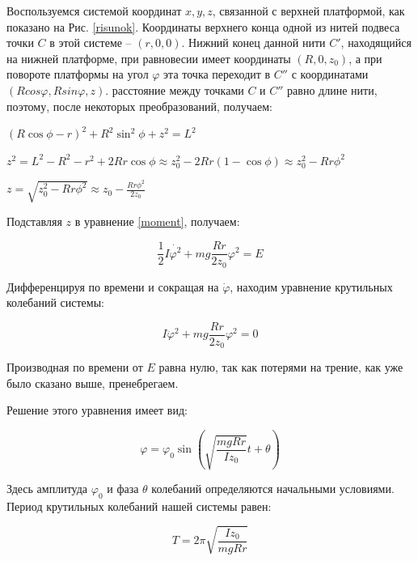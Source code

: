 \documentclass[a4, 12pt]{article}
\begin{document}
	Воспользуемся системой координат $x, y, z$, связанной с верхней платформой, как показано на Рис. \ref{risunok}. Координаты верхнего конца одной из нитей подвеса точки $C$ в этой системе -- $(r, 0, 0)$. Нижний конец данной нити $C'$, находящийся на нижней платформе, при равновесии имеет координаты $(R, 0, z_0)$, а при повороте платформы на угол $\varphi$ эта точка переходит в $C''$ с координатами $(Rcos\varphi, Rsin\varphi, z)$. расстояние между точками $C$ и $C''$ равно длине нити, поэтому, после некоторых преобразований, получаем:

	\begin{center}
	\begin{spacing}{1.6}
		$ (R\cos\phi - r)^2 + R^2\sin^2\phi + z^2 = L^2 $

		$ z^2 = L^2 - R^2 - r^2 + 2Rr\cos\phi \approx z^2_{0} - 2Rr(1 - \cos\phi) \approx z^2_{0} - Rr\phi^2 $

		$ z = \sqrt{z^2_{0} - Rr\phi^2} \approx z_{0} - \frac{Rr\phi^2}{2z_{0}} $
	\end{spacing}
	\end{center}

	Подставляя $z$ в уравнение \eqref{moment}, получаем:

	\begin{equation}
		\frac{1}{2}I\dot{\varphi^2} + mg \frac{Rr}{2z_0}\varphi^2 = E
	\end{equation}

	Дифференцируя по времени и сокращая на $\dot\varphi$, находим уравнение крутильных колебаний системы:

	\begin{equation}
		I\ddot\varphi^2 + mg\frac{Rr}{2z_0}\varphi^2 = 0
	\end{equation}

	Производная по времени от $E$ равна нулю, так как потерями на трение, как уже было сказано выше, пренебрегаем.

	Решение этого уравнения имеет вид:

	\begin{equation}
		\varphi = \varphi_0 \sin \left(\sqrt{\frac{mgRr}{Iz_0}}t + \theta\right)
	\end{equation}

	Здесь амплитуда $\varphi_0$ и фаза $\theta$ колебаний определяются начальными условиями. Период крутильных колебаний нашей системы равен:

	\begin{equation}
		T = 2\pi \sqrt{\frac{Iz_0}{mgRr}}
	\end{equation}
\end{document}
